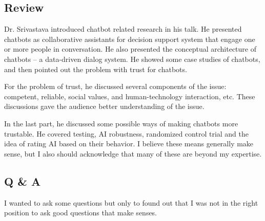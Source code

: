 \documentclass[11pt, oneside]{article}   	%
\begin{document}
\subsection{Review}
Dr. Srivastava introduced chatbot related research in his talk. He presented chatbots as collaborative assistants for decision support system that engage one or more people in conversation. He also presented the conceptual architecture of chatbots -- a data-driven dialog system. He showed some case studies of chatbots, and then pointed out the problem with trust for chatbots.

For the problem of trust, he discussed several components of the issue: competent, reliable, social values, and human-technology interaction, etc. These discussions gave the audience better understanding of the issue.

In the last part, he discussed some possible ways of making chatbots more trustable. He covered testing, AI robustness, randomized control trial and the idea of rating AI based on their behavior. I believe these means generally make sense, but I also should acknowledge that many of these are beyond my expertise.

\subsection{Q \& A}
I wanted to ask some questions but only to found out that I was not in the right position to ask good questions that make senses. 

% 
% 
% 
% 
% 
% 
% 
% 
% 
% 
% 
% 
% 
% 
% 
% 
% 
% 
% 
% 
\end{document}
